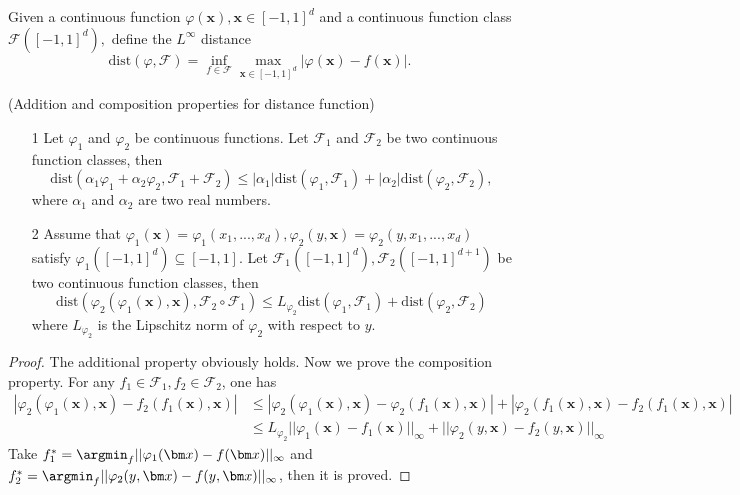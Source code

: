 \begin{definition}
Given a continuous function $\varphi(\bm{x}),\bm{x} \in [-1,1]^d$ and a continuous function class $\mathcal F([-1,1]^d),$ define the $L^\infty$ distance
$$
\mbox{dist} (\varphi,\mathcal F) = \inf_{f\in \mathcal F} \max_{\bm x \in [-1,1]^d} |\varphi(\bm{x}) - f(\bm{x})|.
$$
\end{definition}

\begin{proposition}\label{prop:dis}
(Addition and composition properties for distance function)
\begin{itemize}
\item[1] Let $\varphi_1$ and $\varphi_2$ be continuous functions. Let $\mathcal F_{1}$ and $\mathcal F_2$ be two continuous function classes, then 
$$
\mbox{dist}(\alpha_{1}\varphi_1+\alpha_{2}\varphi_2,\mathcal{F}_1+\mathcal F_2)\le |\alpha_1|\mbox{dist}(\varphi_1,\mathcal F_1) + |\alpha_2|\mbox{dist}(\varphi_2,\mathcal F_2),
$$
where $\alpha_1$ and $\alpha_2$ are two real numbers.
\item[2] Assume that $\varphi_1(\bm x) = \varphi_1(x_1,...,x_d),\varphi_2(y,\bm x) = \varphi_2(y,x_1,...,x_d)$ satisfy $\varphi_1([-1,1]^d)\subseteq[-1,1]$. Let $\mathcal F_1([-1,1]^d),\mathcal F_2([-1,1]^{d+1})$ be two continuous function classes, then
$$
\mbox{dist}(\varphi_2(\varphi_1(\bm x),\bm x),\mathcal F_2\circ \mathcal F_1)\le L_{\varphi_2}\mbox{dist}(\varphi_1,\mathcal F_1) +\mbox{dist}(\varphi_2,\mathcal F_2)
$$
where $L_{\varphi_2}$ is the Lipschitz norm of $\varphi_2$ with respect to $y$.
\end{itemize}
\end{proposition}
\begin{proof}
The additional property obviously holds. Now we prove the composition property. For any $f_1\in\mathcal F_1,f_2\in \mathcal F_2$, one has
\[
\begin{split}
|\varphi_2(\varphi_1(\bm x),\bm x) - f_2(f_1(\bm x),\bm x)|&\le |\varphi_2(\varphi_1(\bm x),\bm x) - \varphi_2(f_1(\bm x),\bm x)|+|\varphi_2(f_1(\bm x),\bm x)-f_2(f_1(\bm x),\bm x)|\\
& \le L_{\varphi_2} ||\varphi_1(\bm x) -f_1(\bm x)||_\infty +||\varphi_2(y,\bm x) - f_2(y,\bm x)||_\infty
\end{split}
\]
Take $f_1^* = \argmin_f ||\varphi_1(\bm x) - f(\bm x)||_\infty$ and $f_2^* = \argmin_f ||\varphi_2(y,\bm x) - f(y,\bm x)||_\infty$, then it is proved.
\end{proof}


